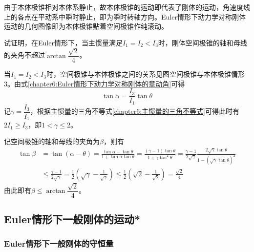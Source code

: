 由于本体极锥相对本体系静止，故本体极锥的运动即代表了刚体的运动，角速度线上的各点在平动系中瞬时静止，即为瞬时转轴方向。Euler情形下动力学对称刚体运动的几何图像即为本体极锥贴着空间极锥作纯滚动。

\begin{example}
试证明，在Euler情形下，当主惯量满足$I_1=I_2<I_3$时，刚体空间极锥的轴和母线的夹角不超过$\arctan\dfrac{\sqrt{2}}{4}$。
\end{example}
\begin{solution}
当$I_1=I_2<I_3$时，空间极锥与本体极锥之间的关系见图{空间极锥与本体极锥情形3}。由式\eqref{chapter6:Euler情形下动力学对称刚体的章动角}可得
\begin{equation*}
	\tan\alpha=\frac{I_3}{I_1}\tan\theta
\end{equation*}
记$\gamma=\dfrac{I_3}{I_1}$，根据主惯量的三角不等式\eqref{chapter6:主惯量的三角不等式}可得此时有$2I_1\geqslant I_3$，即$1<\gamma\leqslant 2$。

记空间极锥的轴和母线的夹角为$\beta$，则有
\begin{align*}
	\tan\beta & = \tan(\alpha-\theta) = \frac{\tan\alpha-\tan\theta}{1+\tan\alpha\tan\theta} = \frac{(\gamma-1)\tan\theta}{1+\gamma\tan^2\theta} = \frac{\gamma-1}{2\sqrt{\gamma}}\frac{2\sqrt{\gamma}\tan\theta}{1-(\sqrt{\gamma}\tan\theta)^2} \\
	& \leqslant \frac{\gamma-1}{2\sqrt{\gamma}} = \frac12 \left(\sqrt{\gamma}-\frac{1}{\sqrt{\gamma}}\right) \leqslant \frac12 \left(\sqrt{2}-\frac{1}{\sqrt{2}}\right) = \frac{\sqrt{2}}{4}
\end{align*}
由此即有$\beta\leqslant \arctan\dfrac{\sqrt{2}}{4}$。
\end{solution}

\subsection{Euler情形下一般刚体的运动*}

\subsubsection{Euler情形下一般刚体的守恒量}

